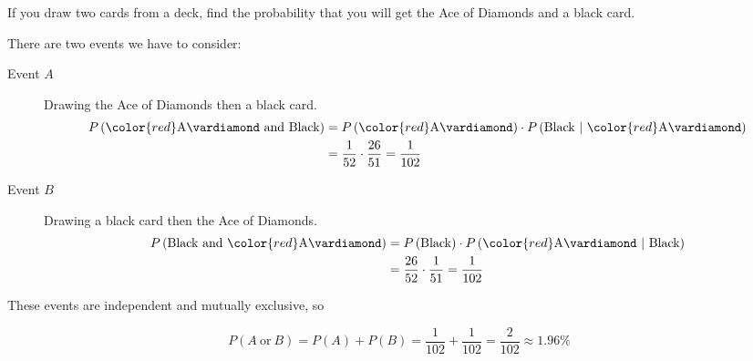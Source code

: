 \documentclass{beamer}
\newcommand{\suitdiamond}[1][]{{\color{red}\text{#1}\vardiamond}}
\newcommand{\prob}[1]{P\left(#1\right)}
\newcommand{\condprob}[2]{\prob{#1~\middle|~#2}}
\begin{document}
\begin{frame}
\begin{example}
If you draw two cards from a deck, find the probability that you will get the Ace of Diamonds and a black card.\pause

\vspace{1mm}
There are two events we have to consider:\pause
\begin{description}
\item[Event $A$] Drawing the Ace of Diamonds then a black card.
\begin{equation*}
\begin{aligned}
\prob{\suitdiamond[A]~\text{and Black}} &= \prob{\suitdiamond[A]}\cdot\condprob{\text{Black}}{\suitdiamond[A]}\\
&= \dfrac{1}{52}\cdot\dfrac{26}{51} = \dfrac{1}{102}
\end{aligned}
\end{equation*}\pause

\vspace{-4mm}
\item[Event $B$] Drawing a black card then the Ace of Diamonds.
\begin{equation*}
\begin{aligned}
\prob{\text{Black and}~\suitdiamond[A]} &= \prob{\text{Black}}\cdot\condprob{\suitdiamond[A]}{\text{Black}} \\
&= \dfrac{26}{52}\cdot\dfrac{1}{51}=\dfrac{1}{102}
\end{aligned}
\end{equation*}\pause
\end{description}

\vspace{-4mm}
These events are independent and mutually exclusive, so 

\vspace{-2.5mm}
\begin{equation*}
\prob{A~\text{or}~B} = \prob{A}+\prob{B} = \dfrac{1}{102}+\dfrac{1}{102} = \dfrac{2}{102} \approx 1.96\%
\end{equation*}
\end{example}
\end{frame}
\end{document}
